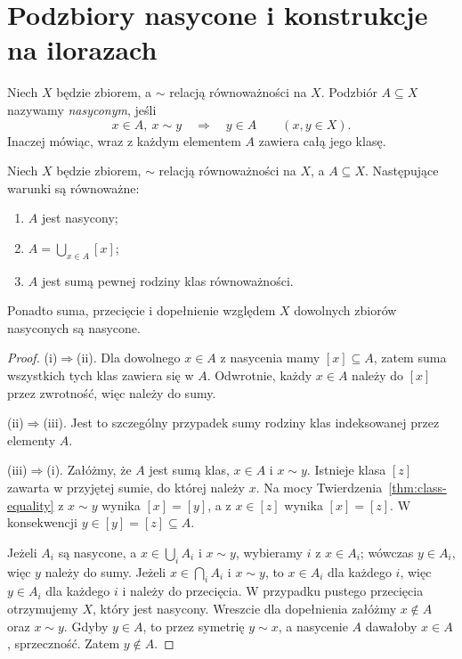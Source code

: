 \section{Podzbiory nasycone i konstrukcje na ilorazach}
\label{sec:eq-saturated}
\begin{definicja}
Niech $X$ będzie zbiorem, a $\sim$ relacją równoważności na $X$.
Podzbiór $A\subseteq X$ nazywamy \emph{nasyconym}, jeśli
\[
 x\in A,\ x\sim y\quad\Longrightarrow\quad y\in A
 \qquad(x,y\in X).
\]
Inaczej mówiąc, wraz z każdym elementem $A$ zawiera całą jego klasę.
\end{definicja}

\begin{twierdzenie}
\label{thm:eq-saturated}
Niech $X$ będzie zbiorem, $\sim$ relacją równoważności
na $X$, a $A\subseteq X$. Następujące warunki są równoważne:
\begin{enumerate}[label=(\roman*)]
\item $A$ jest nasycony;
\item $A=\bigcup_{x\in A}[x]$;
\item $A$ jest sumą pewnej rodziny klas równoważności.
\end{enumerate}
Ponadto suma, przecięcie i dopełnienie względem $X$
dowolnych zbiorów nasyconych są nasycone.
\end{twierdzenie}
\begin{proof}
(i)$\Rightarrow$(ii). Dla dowolnego $x\in A$ z nasycenia
mamy $[x]\subseteq A$, zatem suma wszystkich tych klas
zawiera się w $A$. Odwrotnie, każdy $x\in A$ należy do
$[x]$ przez zwrotność, więc należy do sumy.

(ii)$\Rightarrow$(iii). Jest to szczególny przypadek sumy
rodziny klas indeksowanej przez elementy $A$.

(iii)$\Rightarrow$(i). Załóżmy, że $A$ jest sumą klas,
$x\in A$ i $x\sim y$. Istnieje klasa $[z]$ zawarta w
przyjętej sumie, do której należy $x$. Na mocy
Twierdzenia~\ref{thm:class-equality} z $x\sim y$ wynika
$[x]=[y]$, a z $x\in[z]$ wynika $[x]=[z]$.
W konsekwencji $y\in[y]=[z]\subseteq A$.

Jeżeli $A_i$ są nasycone, a $x\in\bigcup_i A_i$ i $x\sim y$,
wybieramy $i$ z $x\in A_i$; wówczas $y\in A_i$,
więc $y$ należy do sumy. Jeżeli $x\in\bigcap_i A_i$
i $x\sim y$, to $x\in A_i$ dla każdego $i$, więc
$y\in A_i$ dla każdego $i$ i należy do przecięcia.
W przypadku pustego przecięcia otrzymujemy $X$, który
jest nasycony. Wreszcie dla dopełnienia załóżmy
$x\notin A$ oraz $x\sim y$. Gdyby $y\in A$, to przez
symetrię $y\sim x$, a nasycenie $A$ dawałoby $x\in A$,
sprzeczność. Zatem $y\notin A$.
\end{proof}

